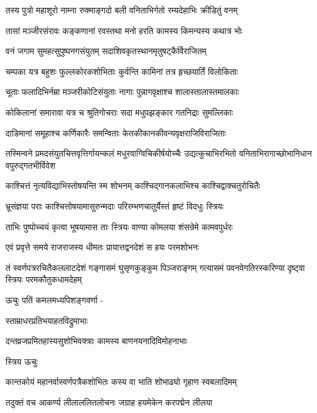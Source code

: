 \twolineshloka
{तस्य पुत्रो महाशूरो नाम्ना रुक्माङ्गदो बली}
{वनिताभिर्गतो रम्यदेहाभिः क्रीडितुं वनम्}%

\twolineshloka
{तासां मञ्जीरसंरावः कङ्कणानां रवस्तथा}
{मनो हरति कामस्य किमन्यस्य कथात्र भोः}%

\twolineshloka
{वनं जगाम सुमहत्सुपुष्पनगसंयुतम्}
{सदाशिवकृतस्थानमृतुषट्कैर्विराजितम्}%

\twolineshloka
{चम्पका यत्र बहुशः फुल्लकोरकशोभिताः}
{कुर्वन्ति कामिनां तत्र हृच्छयार्तिं विलोकिताः}%

\twolineshloka
{चूताः फलादिभिर्नम्रा मञ्जरीकोटिसंयुताः}
{नागाः पुन्नागवृक्षाश्च शालास्तालास्तमालकाः}%

\twolineshloka
{कोकिलानां समारावा यत्र च श्रुतिगोचराः}
{सदा मधुपझङ्कार गतनिद्राः सुमल्लिकाः}%

\twolineshloka
{दाडिमानां समूहाश्च कर्णिकारैः समन्विताः}
{केतकीकानकीवन्यवृक्षराजिविराजिताः}%

\twolineshloka
{तस्मिन्वने प्रमदसंयुतचित्तवृत्तिर्गायन्कलं मधुरवाग्विचिकीर्षयोच्चैः}
{उद्यत्कुचाभिरभितो वनिताभिरागाच्छोभानिधान वपुरुद्गतभीर्विवेश}%

\twolineshloka
{काश्चित्तं नृत्यविद्याभिस्तोषयन्ति स्म शोभनम्}
{काश्चिद्गानकलाभिश्च काश्चिद्वाक्चतुरोचितैः}%

\twolineshloka
{भ्रूसंज्ञया पराः काश्चित्तोषयामासुरुन्मदाः}
{परिरम्भणचातुर्यैस्तं हृष्टं विदधुः स्त्रियः}%

\twolineshloka
{ताभिः पुष्पोच्चयं कृत्वा भूषयामास ताः स्त्रियः}
{वाण्या कोमलया शंसन्रेमे कामवपुर्धरः}%

\twolineshloka
{एवं प्रवृत्ते समये राजराजस्य धीमतः}
{प्रायात्तद्वनदेशं स हयः परमशोभनः}%

\fourlineindentedshloka
{तं स्वर्णपत्ररचितैकललाटदेशं}
{गङ्गासमं घुसृणकुङ्कुम पिञ्जराङ्गम्}
{गत्यासमं पवनवेगतिरस्करिण्या}
{दृष्ट्वा स्त्रियः परमकौतुकधामदेहम्}%

ऊचुः पतिं कमलमध्यपिशङ्गवर्णा -

स्ताम्राधरप्रतिभयाहतविद्रुमाभाः

\twolineshloka
{दन्तव्रजप्रमितहास्यसुशोभिवक्त्राः}
{कामस्य बाणनयनादिविमोहनाभाः}%

स्त्रिय ऊचुः

\twolineshloka
{कान्तकोयं महानर्वास्वर्णपत्रैकशोभितः}
{कस्य वा भाति शोभाढ्यो गृहाण स्वबलादिमम्}%


\twolineshloka
{तदुक्तं वच आकर्ण्य लीलाललितलोचनः}
{जग्राह हयमेकेन करपद्मेन लीलया}%

